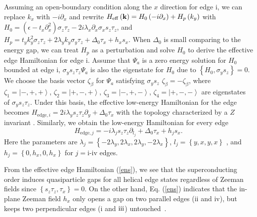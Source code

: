 \documentclass[twocolumn,prl,floatfix,citeautoscript,nofootinbib,superscriptaddress]{revtex4}
\begin{document}
Assuming an open-boundary condition along the $x$ direction for edge $%
\mathrm{i}$, we can replace $k_{x}$ with $-i\partial _{x}$ and rewrite $H_{%
\mathrm{eff}}\left( \mathbf{k}\right) =H_{0}\left( -i\partial _{x}\right)
+H_{p}\left( k_{y}\right) $ with $H_{0}=\left( \epsilon -t_{x}\partial
_{x}^{2}\right) \sigma _{z}\tau _{z}-2i\lambda _{x}\partial _{x}\sigma
_{x}s_{z}\tau _{z}$, and $H_{p}=t_{y}k_{y}^{2}\sigma _{z}\tau _{z}+2\lambda
_{y}k_{y}\sigma _{y}\tau _{z}+\Delta _{0}\tau _{x}+h_{x}s_{x}$. When $\Delta
_{0}$ is small comparing to the energy gap, we can treat $H_{p}$ as a
perturbation and solve $H_{0}$ to derive the effective edge Hamiltonian for
edge $\mathrm{i}$. Assume that $\Psi _{a}$ is a zero energy solution for $%
H_{0}$ bounded at edge $\mathrm{i}$, $\sigma _{y}s_{z}\tau _{z}\Psi _{a}$ is
also the eigenstate for $H_{0}$ due to $\left\{ H_{0},\sigma
_{y}s_{z}\right\} =0$. We choose the basis vector $\zeta _{\beta }$ for $%
\Psi _{a}$ satisfying $\sigma _{y}s_{z}$ $\zeta _{\beta }=-\zeta _{\beta }$,
where $\zeta _{1}=\left\vert -,+,+\right\rangle $, $\zeta _{2}=\left\vert
+,-,+\right\rangle $, $\zeta _{3}=\left\vert -,+,-\right\rangle $, $\zeta
_{4}=\left\vert +,-,-\right\rangle $ are eigenstates of $\sigma
_{y}s_{z}\tau _{z}$. Under this basis, the effective low-energy Hamiltonian
for the edge becomes $H_{\mathrm{edge,}i}=2i\lambda _{y}s_{z}\tau
_{z}\partial _{y}+\Delta _{0}\tau _{x}$ with the topology characterized by a
$Z$ invariant \cite{Geier2018}. Similarly, we obtain the low-energy
Hamiltonian for every edge %
\begin{equation}
H_{\mathrm{edge},j}=-i\lambda _{j}s_{z}\tau _{z}\partial _{l_{j}}+\Delta
_{0}\tau _{x}+h_{j}s_{x}.  \label{ens}
\end{equation}%
Here the parameters are $\lambda _{j}=\left\{ -2\lambda _{y},2\lambda
_{x},2\lambda _{y},-2\lambda _{x}\right\} $, $l_{j}=\left\{ y,x,y,x\right\} $%
, and $h_{j}=\left\{ 0,h_{x},0,h_{x}\right\} $ for $j=\mathrm{i}$-$\mathrm{iv%
}$ edges.

From the effective edge Hamiltonian (\ref{ens}), we see that the
superconducting order induces quasiparticle gaps for all helical edge states
regardless of Zeeman fields since $\left\{ s_{z}\tau _{z},\tau _{x}\right\}
=0$. On the other hand, Eq. (\ref{ens}) indicates that the in-plane Zeeman
field $h_{x}$ only opens a gap on two parallel edges ($\mathrm{ii}$ and $%
\mathrm{iv}$), but keeps two perpendicular edges ($\mathrm{i}$ and $\mathrm{%
iii}$) untouched~\cite{SM}.
\end{document}
